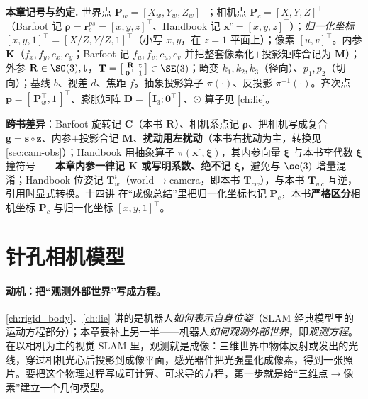 \begin{note}
\textbf{本章记号与约定.}\;
世界点 $\mathbf{P}_w=[X_w,Y_w,Z_w]^\top$；相机点 $\mathbf{P}_c=[X,Y,Z]^\top$（Barfoot\cite{barfoot2024state} 记 $\boldsymbol\rho=\mathbf{r}_s^{ps}=[x,y,z]^\top$、Handbook\cite{carlone2026handbook} 记 $\mathbf{x}^c=[x,y,z]^\top$）；\emph{归一化坐标} $[x,y,1]^\top=[X/Z,Y/Z,1]^\top$（小写 $x,y$，在 $z=1$ 平面上）；像素 $[u,v]^\top$。内参 $\mathbf{K}$（$f_x,f_y,c_x,c_y$；Barfoot 记 $f_u,f_v,c_u,c_v$ 并把整套像素化$+$投影矩阵合记为 $\mathbf{M}$）；外参 $\mathbf{R}\in\SO(3),\mathbf{t}$，$\mathbf{T}=\big[\begin{smallmatrix}\mathbf{R}&\mathbf{t}\\\mathbf{0}^\top&1\end{smallmatrix}\big]\in\SE(3)$；畸变 $k_1,k_2,k_3$（径向）、$p_1,p_2$（切向）；基线 $b$、视差 $d$、焦距 $f$。抽象投影算子 $\pi(\cdot)$、反投影 $\pi^{-1}(\cdot)$。齐次点 $\mathbf{p}=[\,\mathbf{P}_w^\top,1\,]^\top$、膨胀矩阵 $\mathbf{D}=[\mathbf{I}_3;\mathbf{0}^\top]$、$\odot$ 算子见 \cref{ch:lie}。

\textbf{跨书差异}：Barfoot\cite{barfoot2024state} 旋转记 $\mathbf{C}$（本书 $\mathbf{R}$）、相机系点记 $\boldsymbol\rho$、把相机写成复合 $\mathbf{g}=\mathbf{s}\circ\mathbf{z}$、内参$+$投影合记 $\mathbf{M}$、\textbf{扰动用左扰动}（本书右扰动为主，转换见 \cref{sec:cam-obs}）；Handbook\cite{carlone2026handbook} 用抽象算子 $\pi(\mathbf{x}^c,\boldsymbol\xi)$，其内参向量 $\boldsymbol\xi$ 与本书李代数 $\boldsymbol{\xi}$ 撞符号——\textbf{本章内参一律记 $\mathbf{K}$ 或写明系数、绝不记 $\boldsymbol\xi$}，避免与 $\se(3)$ 增量混淆；Handbook 位姿记 $\mathbf{T}_w^i$（world$\to$camera，即本书 $\mathbf{T}_{cw}$），与本书 $\mathbf{T}_{wc}$ 互逆，引用时显式转换。十四讲\cite{gaoxiang2019slam14} 在“成像总结”里把归一化坐标也记 $\mathbf{P}_c$，本书\textbf{严格区分}相机坐标 $\mathbf{P}_c$ 与归一化坐标 $[x,y,1]^\top$。
\end{note}

\section{针孔相机模型}
\label{sec:cam-pinhole}

\paragraph{动机：把“观测外部世界”写成方程。}
\cref{ch:rigid_body}、\cref{ch:lie} 讲的是机器人\emph{如何表示自身位姿}（SLAM 经典模型里的运动方程部分）；本章要补上另一半——机器人\emph{如何观测外部世界}\cite{gaoxiang2019slam14}，即\emph{观测方程}。在以相机为主的视觉 SLAM 里，观测就是成像：三维世界中物体反射或发出的光线，穿过相机光心后投影到成像平面，感光器件把光强量化成像素，得到一张照片。要把这个物理过程写成可计算、可求导的方程，第一步就是给“三维点$\to$像素”建立一个几何模型。

